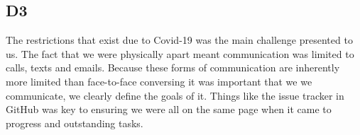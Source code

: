 \subsection*{D3}
    The restrictions that exist due to Covid-19 was the main challenge presented to us. The fact that we were physically apart meant communication was limited to calls, texts and emails. Because these forms of communication are inherently more limited than face-to-face conversing it was important that we we communicate, we clearly define the goals of it. Things like the issue tracker in GitHub was key to ensuring we were all on the same page when it came to progress and outstanding tasks. 